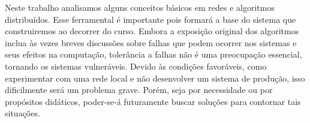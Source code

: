 Neste trabalho analisamos alguns conceitos básicos em redes e
algoritmos distribuídos. Esse ferramental é importante pois formará a
base do sistema que construiremos ao decorrer do curso. Embora a
exposição original dos algoritmos inclua às vezes breves discussões
sobre falhas que podem ocorrer nos sistemas e seus efeitos na
computação, tolerância a falhas não é uma preocupação essencial,
tornando os sistemas vulneráveis. Devido às condições favoráveis, como
experimentar com uma rede local e não desenvolver um sistema de
produção, isso dificilmente será um problema grave. Porém, seja por
necessidade ou por propósitos didáticos, poder-se-á futuramente buscar
soluções para contornar tais situações.
